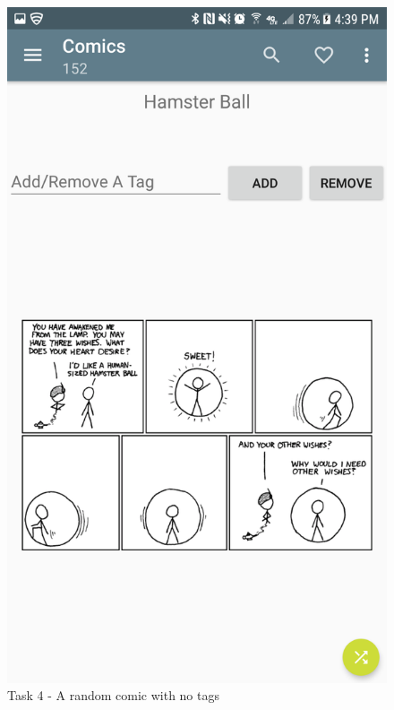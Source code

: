 \documentclass{article}
\makeatletter
\def\maxwidth#1{\ifdim\Gin@nat@width>#1 #1\else\Gin@nat@width\fi}
\makeatother
\begin{document}
	\begin{figure}[ht]
		\includegraphics[width=\maxwidth{3in}]{img/t4s1.png}
		\centering
		\caption{Task 4 - A random comic with no tags}
	\end{figure}
\end{document}
